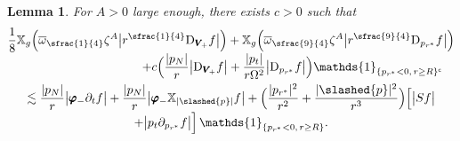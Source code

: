 \documentclass[10pt]{amsart}
\theoremstyle{plain}
\newtheorem{lemma}[proposition]{Lemma}
\theoremstyle{definition}
\newcommand\z{{\zeta}}
\newcommand\T{{\mathbb{X}}}
\begin{document}
\begin{lemma}\label{LemforProestivarphiminusVminus}
For $A>0$ large enough, there exists $c>0$ such that\vspace*{-5pt}
\begin{multline*}
\frac{1}{8}\T_g \Bigl(\overline{\omega}_{\sfrac{1}{4}} \z^A \big| r^{\sfrac{1}{4}}\mathrm{D}_{\pmb{V}_{\!+}} f \big| \Bigr) +\T_g \Bigl(\overline{\omega}_{\sfrac{9}{4}} \z^A \big| r^{\sfrac{9}{4}} \mathrm{D }_{p_{r^*}} f \big| \Bigr) \\[-3pt]
\shoveright{+c\Bigl(\frac{|p_N|}{r } \big|\mathrm{D}_{\pmb{V}_{\!+}} f \big|+\frac{|p_t|}{r \Omega^2} \big| \mathrm{D }_{p_{r^*}} f \big| \Bigr) \mathds{1}_{\{p_{r^*} <0, \, r \geq R\}^\mathsf{c}}}\\
\lesssim \frac{|p_N|}{r} \big| \pmb{\varphi}_- \partial_t f \big| +\frac{|p_N|}{r} \big| \pmb{\varphi}_- \T_{|\slashed{p}|} f \big| + \Bigl(\frac{|p_{r^*}|^2}{r^2 }+ \frac{|\slashed{p}|^2}{r^3 } \Bigr)\Bigl[\big|Sf\big|\\[-2pt]
+ \big|p_t \partial_{p_{r^*}} f\big| \Bigr]\, \mathds{1}_{\{p_{r^*} <0, \, r \geq R\}}.
\end{multline*}
\end{lemma}
\end{document}
